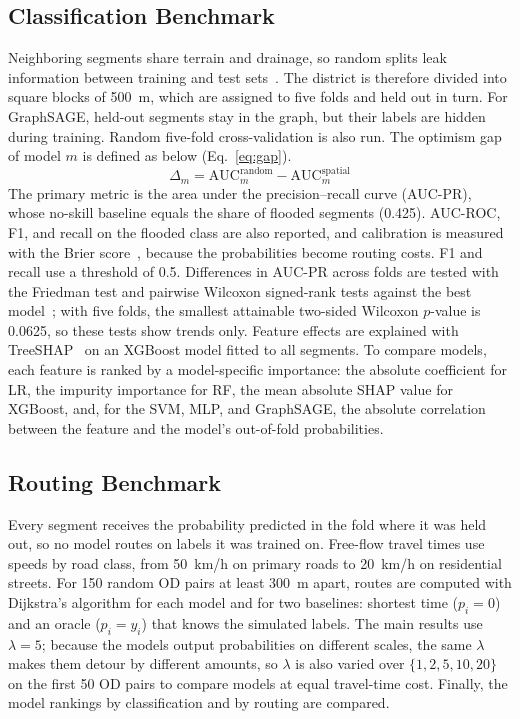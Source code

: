 \subsection{Classification Benchmark}
\label{sec:cv}
Neighboring segments share terrain and drainage, so random splits leak information between training and test sets~\cite{roberts2017}. The district is therefore divided into square blocks of 500~m, which are assigned to five folds and held out in turn. For GraphSAGE, held-out segments stay in the graph, but their labels are hidden during training. Random five-fold cross-validation is also run. The optimism gap of model $m$ is defined as below (Eq.~\ref{eq:gap}).
\begin{equation}
  \Delta_m = \text{AUC}^{\text{random}}_m - \text{AUC}^{\text{spatial}}_m
  \label{eq:gap}
\end{equation}
The primary metric is the area under the precision--recall curve (AUC-PR), whose no-skill baseline equals the share of flooded segments (0.425). AUC-ROC, F1, and recall on the flooded class are also reported, and calibration is measured with the Brier score~\cite{brier1950}, because the probabilities become routing costs. F1 and recall use a threshold of 0.5. Differences in AUC-PR across folds are tested with the Friedman test and pairwise Wilcoxon signed-rank tests against the best model~\cite{demsar2006}; with five folds, the smallest attainable two-sided Wilcoxon $p$-value is 0.0625, so these tests show trends only. Feature effects are explained with TreeSHAP~\cite{lundberg2017} on an XGBoost model fitted to all segments. To compare models, each feature is ranked by a model-specific importance: the absolute coefficient for LR, the impurity importance for RF, the mean absolute SHAP value for XGBoost, and, for the SVM, MLP, and GraphSAGE, the absolute correlation between the feature and the model's out-of-fold probabilities.

\subsection{Routing Benchmark}
Every segment receives the probability predicted in the fold where it was held out, so no model routes on labels it was trained on. Free-flow travel times use speeds by road class, from 50~km/h on primary roads to 20~km/h on residential streets. For 150 random OD pairs at least 300~m apart, routes are computed with Dijkstra's algorithm for each model and for two baselines: shortest time ($p_i=0$) and an oracle ($p_i=y_i$) that knows the simulated labels. The main results use $\lambda=5$; because the models output probabilities on different scales, the same $\lambda$ makes them detour by different amounts, so $\lambda$ is also varied over $\{1, 2, 5, 10, 20\}$ on the first 50 OD pairs to compare models at equal travel-time cost. Finally, the model rankings by classification and by routing are compared.

